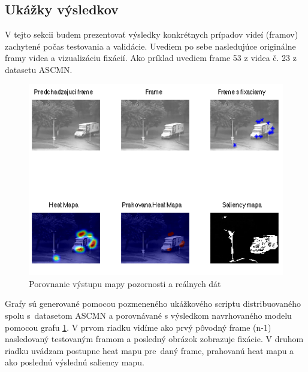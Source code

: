 \subsection{Ukážky výsledkov}
V tejto sekcii budem prezentovať výsledky konkrétnych prípadov videí (framov) zachytené počas testovania a validácie.
Uvediem po sebe nasledujúce originálne framy videa a vizualizáciu fixácií. Ako príklad uvediem frame 53 z videa č. 23 z datasetu ASCMN\cite{accv}.
\begin{figure}[H]
  \centering
  \includegraphics[width=15cm]{pics/ACCV-23-54-compare.png}
  \caption{Porovnanie výstupu mapy pozornosti a reálnych dát}
  \label{fig:ASCMN-53-23}
  \vspace{10mm}
\end{figure}
Grafy sú generované pomocou pozmeneného ukážkového scriptu distribuovaného spolu s~datasetom ASCMN\cite{accv} a porovnávané s výsledkom navrhovaného modelu pomocou grafu \ref{fig:ASCMN-53-23}.
V prvom riadku vidíme ako prvý pôvodný frame (n-1) nasledovaný testovaným framom a posledný obrázok zobrazuje fixácie.
V druhom riadku uvádzam postupne heat mapu pre~daný frame, prahovanú heat mapu a ako poslednú výslednú saliency mapu.

